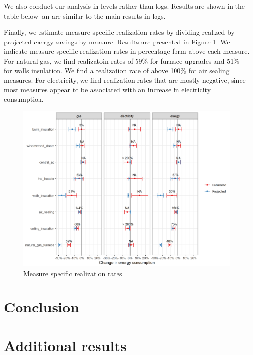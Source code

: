 \documentclass{article}
\begin{document}


We also conduct our analysis in levels rather than logs. Results are shown in the table below, an are similar to the main results in logs.



Finally, we estimate measure specific realization rates by dividing realized by projected energy savings by measure.  Results are presented in Figure \ref{fig_rr_mbm}. We indicate measure-specific realization rates in percentage form above each measure. For natural gas, we find realizatoin rates of 59\% for furnace upgrades and 51\% for walls insulation. We find a realization rate of above 100\% for air sealing measures. For electricity, we find realization rates that are mostly negative, since most measures appear to be associated with an increase in electricity consumption.

\begin{figure}
	\includegraphics[width=\linewidth]{../output_figures_tables/mbm_realization_rate.png}
	\caption{Measure specific realization rates}\label{fig_rr_mbm}
\end{figure}

\section{Conclusion}

\clearpage


\clearpage

\appendix
\section{Additional results}
\setcounter{table}{0}
\renewcommand{\thetable}{\Alph{section}\arabic{table}}


\end{document}
